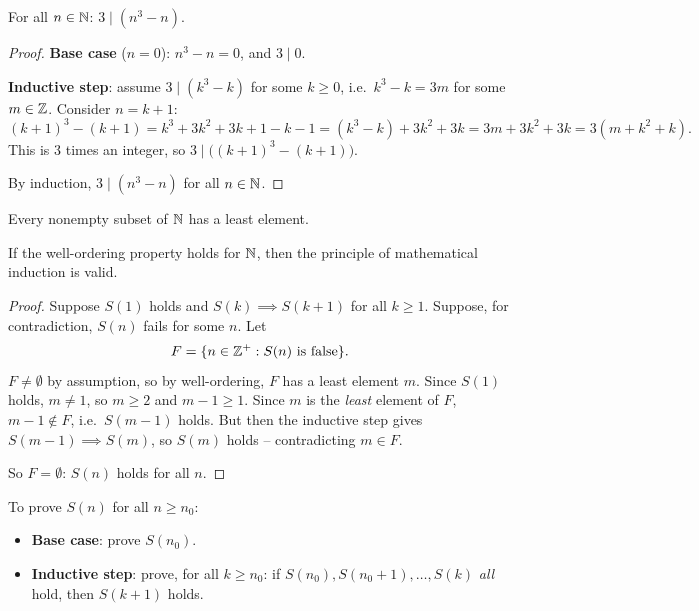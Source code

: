 \documentclass[11pt]{article}
\begin{document}
\bigskip
\begin{theorem}
For all $n\in\mathbb{N}$: $3 \mid (n^3-n)$.
\end{theorem}
\begin{proof}
\textbf{Base case} ($n=0$): $n^3-n=0$, and $3\mid 0$.

\textbf{Inductive step}: assume $3\mid(k^3-k)$ for some $k\ge0$, i.e.\ $k^3-k=3m$ for some $m\in\mathbb{Z}$. Consider $n=k+1$:
\[
(k+1)^3-(k+1) = k^3+3k^2+3k+1-k-1 = (k^3-k) + 3k^2+3k = 3m+3k^2+3k = 3(m+k^2+k).
\]
This is $3$ times an integer, so $3\mid\big((k+1)^3-(k+1)\big)$.

By induction, $3\mid(n^3-n)$ for all $n\in\mathbb{N}$.
\end{proof}

\bigskip
\begin{definition}
Every nonempty subset of $\mathbb{N}$ has a least element.
\end{definition}

\begin{theorem}
If the well-ordering property holds for $\mathbb{N}$, then the principle of mathematical induction is valid.
\end{theorem}
\begin{proof}
Suppose $S(1)$ holds and $S(k)\implies S(k+1)$ for all $k\ge1$. Suppose, for contradiction, $S(n)$ fails for some $n$. Let
\[
F = \{n\in\mathbb{Z}^+ : S(n) \text{ is false}\}.
\]
$F\neq\emptyset$ by assumption, so by well-ordering, $F$ has a least element $m$. Since $S(1)$ holds, $m\neq1$, so $m\ge2$ and $m-1\ge1$. Since $m$ is the \emph{least} element of $F$, $m-1\notin F$, i.e.\ $S(m-1)$ holds. But then the inductive step gives $S(m-1)\implies S(m)$, so $S(m)$ holds -- contradicting $m\in F$.

So $F=\emptyset$: $S(n)$ holds for all $n$.
\end{proof}

\bigskip
\begin{definition}
To prove $S(n)$ for all $n\ge n_0$:
\begin{itemize}
    \item \textbf{Base case}: prove $S(n_0)$.
    \item \textbf{Inductive step}: prove, for all $k\ge n_0$: if $S(n_0),S(n_0+1),\dots,S(k)$ \emph{all} hold, then $S(k+1)$ holds.
\end{itemize}
\end{definition}
\end{document}
